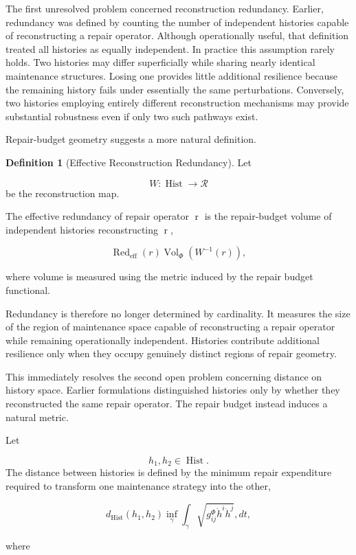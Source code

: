 \documentclass[12pt,oneside]{article}
\theoremstyle{plain}
\theoremstyle{definition}
\newtheorem{definition}[theorem]{Definition}
\theoremstyle{remark}
\DeclareMathOperator{\Hist}{Hist}
\DeclareMathOperator{\Vol}{Vol}
\begin{document}
The first unresolved problem concerned reconstruction redundancy. Earlier, redundancy was defined by counting the number of independent histories capable of reconstructing a repair operator. Although operationally useful, that definition treated all histories as equally independent. In practice this assumption rarely holds. Two histories may differ superficially while sharing nearly identical maintenance structures. Losing one provides little additional resilience because the remaining history fails under essentially the same perturbations. Conversely, two histories employing entirely different reconstruction mechanisms may provide substantial robustness even if only two such pathways exist.

Repair-budget geometry suggests a more natural definition.

\begin{definition}[Effective Reconstruction Redundancy]
Let

\[
W:\Hist\rightarrow\mathcal R
\]
be the reconstruction map.

The effective redundancy of repair operator r is the repair-budget volume of independent histories reconstructing r,

\[
\operatorname{Red}_{\mathrm{eff}}(r)
\Vol_{\Phi}
\left(
W^{-1}(r)
\right),
\]

where volume is measured using the metric induced by the repair budget functional.
\end{definition}

Redundancy is therefore no longer determined by cardinality. It measures the size of the region of maintenance space capable of reconstructing a repair operator while remaining operationally independent. Histories contribute additional resilience only when they occupy genuinely distinct regions of repair geometry.

This immediately resolves the second open problem concerning distance on history space. Earlier formulations distinguished histories only by whether they reconstructed the same repair operator. The repair budget instead induces a natural metric.

Let

\[
h_1,h_2\in\Hist.
\]
The distance between histories is defined by the minimum repair expenditure required to transform one maintenance strategy into the other,

\[
d_{\Hist}(h_1,h_2)
\inf_{\gamma}
\int_{\gamma}
\sqrt{
g^{\Phi}_{ij}
\dot h^i
\dot h^j
}
,dt,
\]

where
\end{document}
